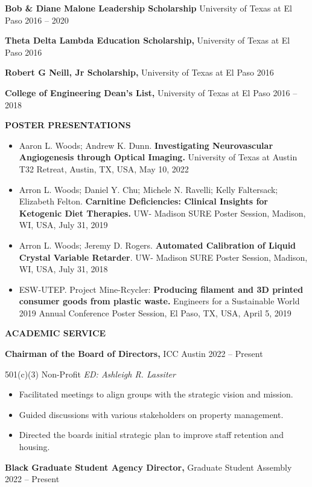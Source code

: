\documentclass[
]{article}
\begin{document}
\textbf{Bob \& Diane Malone Leadership Scholarship} University of Texas at El Paso 2016 -- 2020

\textbf{Theta Delta Lambda Education Scholarship,} University of Texas at El Paso 2016

\textbf{Robert G Neill, Jr Scholarship,} University of Texas at El Paso 2016

\textbf{College of Engineering Dean's List,} University of Texas at El Paso 2016 -- 2018

\textbf{POSTER PRESENTATIONS}

\begin{itemize}
\item
  Aaron L. Woods; Andrew K. Dunn. \textbf{Investigating Neurovascular Angiogenesis through Optical Imaging.} University of Texas at Austin T32 Retreat, Austin, TX, USA, May 10, 2022
\item
  Arron L. Woods; Daniel Y. Chu; Michele N. Ravelli; Kelly Faltersack; Elizabeth Felton. \textbf{Carnitine Deficiencies: Clinical Insights for Ketogenic Diet Therapies.} UW- Madison SURE Poster Session, Madison, WI, USA, July 31, 2019
\item
  Arron L. Woods; Jeremy D. Rogers. \textbf{Automated Calibration of Liquid Crystal Variable Retarder}. UW- Madison SURE Poster Session, Madison, WI, USA, July 31, 2018
\item
  ESW-UTEP. Project Mine-Rcycler: \textbf{Producing filament and 3D printed consumer goods from plastic waste.} Engineers for a Sustainable World 2019 Annual Conference Poster Session, El Paso, TX, USA, April 5, 2019
\end{itemize}

\textbf{ACADEMIC SERVICE}

\textbf{Chairman of the Board of Directors,} ICC Austin 2022 -- Present

501(c)(3) Non-Profit \textbar{} \emph{ED: Ashleigh R. Lassiter}

\begin{itemize}
\item
  Facilitated meetings to align groups with the strategic vision and mission.
\item
  Guided discussions with various stakeholders on property management.
\item
  Directed the board\textquotesingle s initial strategic plan to improve staff retention and housing.
\end{itemize}

\textbf{Black Graduate Student Agency Director,} Graduate Student Assembly 2022 -- Present
\end{document}

